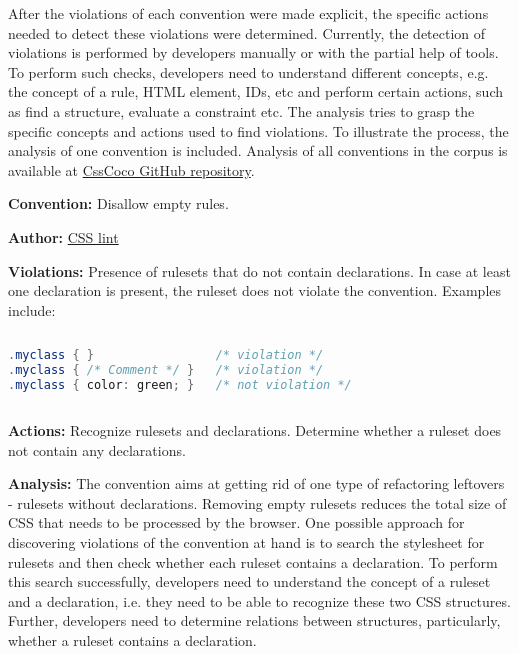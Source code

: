 \documentclass[parskip=full]{uvamscse}
\begin{document}
After the violations of each convention were made explicit, the specific actions needed to detect
these violations were determined. Currently, the detection of violations is performed by developers
manually or with the partial help of tools. To perform such checks, developers need to understand
different concepts, e.g. the concept of a rule, HTML element, IDs, etc and perform certain actions,
such as find a structure, evaluate a constraint etc. The analysis tries to grasp the specific
concepts and actions used to find violations. To illustrate the process, the analysis of one convention is included. Analysis of all conventions in the corpus is available at
\href{https://github.com/boryanagoncharenko/CssCoco/blob/master/analysis.md}{CssCoco GitHub
repository}.

\begin{description}
\item\textbf{Convention:} Disallow empty rules.
\item\textbf{Author:} \href{https://github.com/CSSLint/csslint/wiki/Disallow-empty-rules}{CSS lint}
\item\textbf{Violations:} Presence of rulesets that do not contain declarations. In case at least one declaration is present, the ruleset does not violate the convention. Examples include:
\begin{sourcecode}
\begin{lstlisting}[style=mono,language=Java]
.myclass { }                 /* violation */
.myclass { /* Comment */ }   /* violation */
.myclass { color: green; }   /* not violation */
\end{lstlisting}
\end{sourcecode}

\item\textbf{Actions:} Recognize rulesets and declarations. Determine whether a ruleset does not contain any declarations.

\item\textbf{Analysis:} The convention aims at getting rid of one type of refactoring leftovers -
rulesets without declarations. Removing empty rulesets reduces the total size of CSS that
needs to be processed by the browser. One possible approach for discovering violations of the
convention at hand is to search the stylesheet for rulesets and then check whether each ruleset
contains a declaration. To perform this search successfully, developers need to understand the
concept of a ruleset and a declaration, i.e. they need to be able to recognize these two CSS
structures. Further, developers need to determine relations between structures, particularly,
whether a ruleset contains a declaration.

\end{description}
\end{document}
